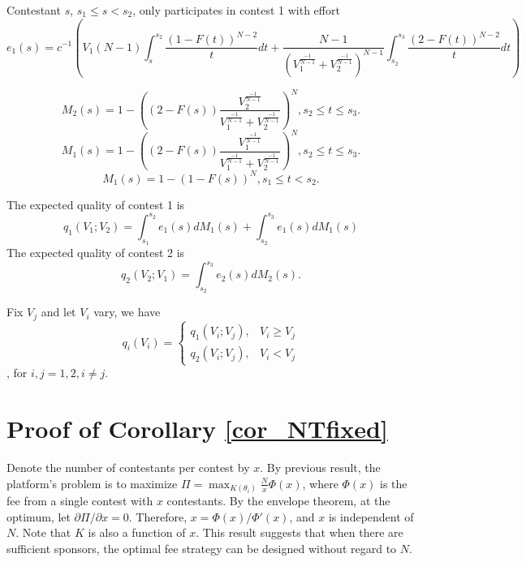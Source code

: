 \documentclass[12pt]{article}
\begin{document}
Contestant $s$, $s_{1}\leq s<s_{2}$, only participates in contest
1 with effort
\[
e_{1}(s)=c^{-1}\left(V_{1}(N-1)\int_{s}^{s_{2}}\frac{(1-F(t))^{N-2}}{t}dt+\frac{N-1}{\left(V_{1}^{\frac{-1}{N-1}}+V_{2}^{\frac{-1}{N-1}}\right)^{N-1}}\int_{s_{2}}^{s_{3}}\frac{(2-F(t))^{N-2}}{t}dt\right)
\]


\[
M_{2}(s)=1-\left((2-F(s))\frac{V_{2}^{\frac{-1}{N-1}}}{V_{1}^{\frac{-1}{N-1}}+V_{2}^{\frac{-1}{N-1}}}\right)^{N},s_{2}\leq t\leq s_{3}.
\]
\[
M_{1}(s)=1-\left((2-F(s))\frac{V_{1}^{\frac{-1}{N-1}}}{V_{1}^{\frac{-1}{N-1}}+V_{2}^{\frac{-1}{N-1}}}\right)^{N},s_{2}\leq t\leq s_{3}.
\]
\[
M_{1}(s)=1-(1-F(s))^{N},s_{1}\leq t<s_{2}.
\]

The expected quality of contest 1 is
\[
q_{1}(V_{1};V_{2})=\int_{s_{1}}^{s_{2}}e_{1}(s)dM_{1}(s)+\int_{s_{2}}^{s_{3}}e_{1}(s)dM_{1}(s)
\]
The expected quality of contest 2 is
\[
q_{2}(V_{2};V_{1})=\int_{s_{2}}^{s_{3}}e_{2}(s)dM_{2}(s).
\]


Fix $V_{j}$ and let $V_{i}$ vary, we have
\[
q_{i}(V_{i})=\begin{cases}
q_{1}(V_{i};V_{j}), & V_{i}\geq V_{j}\\
q_{2}(V_{i};V_{j}), & V_{i}<V_{j}
\end{cases}
\]
, for $i,j=1,2,i\neq j$.

\section{Proof of Corollary \ref{cor_NTfixed}}
Denote the number of contestants per contest by $x$. By previous result, the platform's problem is to maximize $\Pi=\max_{K(\theta_{i})}\frac{N}{x} \Phi(x)$, where $\Phi(x)$ is the fee from a single contest with $x$ contestants.  By the envelope theorem, at the optimum, let $\partial \Pi/\partial x=0$. Therefore, $x=\Phi(x)/\Phi'(x)$, and $x$ is independent of $N$. Note that $K$ is also a function of $x$. This result suggests that when there are sufficient sponsors, the optimal fee strategy can be designed without regard to $N$.
\end{document}
